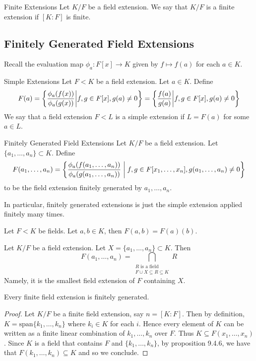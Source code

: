 \documentclass[a4paper]{article}
\begin{document}
\begin{defn}{Finite Extensions}{} Let $K/F$ be a field extension. We say that $K/F$ is a finite extension if $[K:F]$ is finite. 
\end{defn}

\subsection{Finitely Generated Field Extensions}
Recall the evaluation map $\phi_a:F[x]\to K$ given by $f\mapsto f(a)$ for each $a\in K$. 

\begin{defn}{Simple Extensions}{} Let $F<K$ be a field extension. Let $a\in K$. Define 
$$F(a)=\left\{\frac{\phi_a(f(x))}{\phi_a(g(x))}\bigg{|}f,g\in F[x],g(a)\neq 0\right\}=\left\{\frac{f(a)}{g(a)}\bigg{|}f,g\in F[x],g(a)\neq 0\right\}$$
We say that a field extension $F<L$ is a simple extension if $L=F(a)$ for some $a\in L$. 
\end{defn}

\begin{defn}{Finitely Generated Field Extensions}{} Let $K/F$ be a field extension. Let $\{a_1,\dots,a_n\}\subset K$. Define $$F(a_1,\dots,a_n)=\left\{\frac{\phi_a(f(a_1,\dots,a_n))}{\phi_a(g(a_1,\dots,a_n))}\;\bigg{|}\;f,g\in F[x_1,\dots,x_n],g(a_1,\dots,a_n)\neq 0\right\}$$ to be the field extension finitely generated by $a_1,\dots,a_n$. 
\end{defn}

In particular, finitely generated extensions is just the simple extension applied finitely many times. 

\begin{lmm}{}{} Let $F<K$ be fields. Let $a,b\in K$, then $F(a,b)=F(a)(b)$. 
\end{lmm}

\begin{prp}{}{} Let $K/F$ be a field extension. Let $X=\{a_1,\dots,a_n\}\subset K$. Then $$F(a_1,\dots,a_n)=\bigcap_{\substack{R\text{ is a field}\\F\cup X\subseteq R\subseteq K}}R$$ Namely, it is the smallest field extension of $F$ containing $X$. 
\end{prp}

\begin{prp}{}{} Every finite field extension is finitely generated. 
\begin{proof}
Let $K/F$ be a finite field extension, say $n=[K:F]$. Then by definition, $K=\text{span}\{k_1,\dots,k_n\}$ where $k_i\in K$ for each $i$. Hence every element of $K$ can be written as a finite linear combination of $k_1,\dots,k_n$ over $F$. Thus $K\subseteq F(x_1,\dots,x_n)$. Since $K$ is a field that contains $F$ and $\{k_1,\dots,k_n\}$, by proposition 9.4.6, we have that $F(k_1,\dots,k_n)\subseteq K$ and so we conclude. 
\end{proof}
\end{prp}
\end{document}
